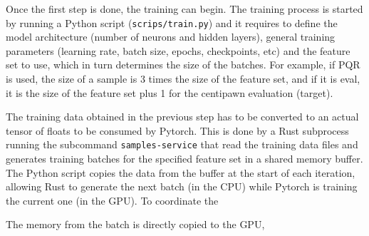 
Once the first step is done, the training can begin. The training process is started by running a Python script (\texttt{scrips/train.py}) and it requires to define the model architecture (number of neurons and hidden layers), general training parameters (learning rate, batch size, epochs, checkpoints, etc) and the feature set to use, which in turn determines the size of the batches. For example, if PQR is used, the size of a sample is 3 times the size of the feature set, and if it is eval, it is the size of the feature set plus 1 for the centipawn evaluation (target).

The training data obtained in the previous step has to be converted to an actual tensor of floats to be consumed by Pytorch. This is done by a Rust subprocess running the subcommand \texttt{samples-service} that read the training data files and generates training batches for the specified feature set in a shared memory buffer. The Python script copies the data from the buffer at the start of each iteration, allowing Rust to generate the next batch (in the CPU) while Pytorch is training the current one (in the GPU). To coordinate the 


The memory from the batch is directly copied to the GPU, 